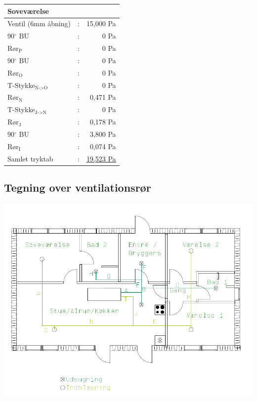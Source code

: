 \begin{table}[h!]
    \begin{center}
       \begin{tabular}{lcr}
           \hline
           \hline
           \textbf{Soveværelse} &  & \\
           \hline
           \hline
           Ventil (6mm åbning) & : & 15,000 Pa \\
           90$^\circ$ BU    & : & 0 Pa \\
           Rør$_{\text{P}}$ & : & 0 Pa \\
           90$^\circ$ BU    & : & 0 Pa \\
           Rør$_{\text{O}}$ & : & 0 Pa \\
           T-Stykke$_{\text{N->O}}$  & : & 0 Pa\\
           Rør$_{\text{N}}$ & : & 0,471 Pa \\
           T-Stykke$_{\text{J->N}}$  & : & 0 Pa\\
           Rør$_{\text{J}}$ & : & 0,178 Pa \\
           90$^\circ$ BU    & : & 3,800 Pa \\
           Rør$_{\text{I}}$ & : & 0,074 Pa \\
           \hline
           Samlet tryktab & : & \underline{\underline{ 19,523 Pa}} 
       \end{tabular}
   \end{center}
\end{table}



\subsection{Tegning over ventilationsrør} \label{fig:tegning_ventr}
\includegraphics[scale=0.60,angle=90,origin=c]{appendix/ventilation/ventilation_tegning.png}%